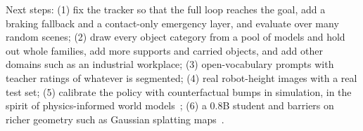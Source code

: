 \documentclass[10pt,a4paper]{article}
\begin{document}
Next steps: (1) fix the tracker so that the full loop reaches the goal, add a braking fallback and a contact-only emergency layer, and
evaluate over many random scenes; (2) draw every object category from a pool of models and hold out whole families, add more supports
and carried objects, and add other domains such as an industrial workplace; (3) open-vocabulary prompts with teacher ratings of
whatever is segmented; (4) real robot-height images with a real test set; (5) calibrate the policy with counterfactual bumps in
simulation, in the spirit of physics-informed world models~\cite{li2025pinwm}; (6) a 0.8B student and barriers on richer geometry
such as Gaussian splatting maps~\cite{chen2025safersplat,tscholl2025collisioncone}.

\end{document}
